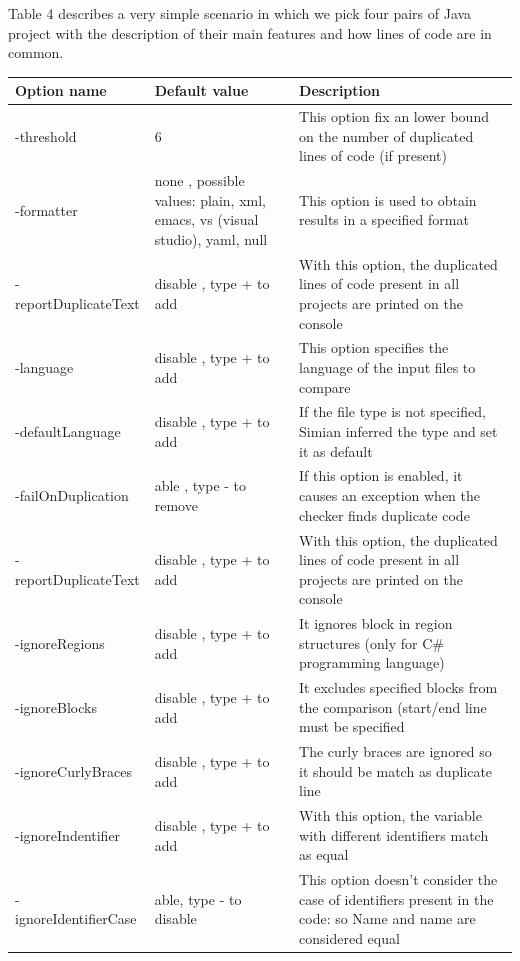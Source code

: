 Table 4 describes a very simple scenario in which we pick four pairs of Java project with the description of their main features and how lines of code are in common.

\begin{center}
	\begin{table}[!h]
		\small
		\begin{tabular}{|l|p{4cm}|p{6cm}|}\hline				
			\textbf{Option name} & \textbf{Default value} & 
			\textbf{Description} \\	\hline
			-threshold & 6 &This option fix an lower bound on the number   
			of duplicated lines of code (if present)  \\\hline
			-formatter &  none , possible values: plain, xml, emacs,    vs 
			(visual studio), yaml, null &   This option is used to obtain 
			results in a specified format\\\hline
			-reportDuplicateText & disable , type + to add &   With this 
			option, the duplicated lines of code  present in all projects 
			are printed on the console    \\\hline
			-language & disable , type + to add &  This option specifies the language of the input files to compare   \\\hline
			-defaultLanguage & disable , type + to add &   If the file type 
			is not specified, Simian inferred the type and set it as default    \\\hline
			-failOnDuplication & able , type - to remove & If this option is enabled, it causes an exception when the checker finds duplicate code     \\\hline
			-reportDuplicateText & disable , type + to add & With this 	option, the duplicated lines of code present in all projects are printed on the console    \\\hline
			-ignoreRegions & disable , type + to add & It ignores block in region structures (only for C\# programming language)  \\\hline
			-ignoreBlocks & disable , type + to add &  It excludes specified blocks from the comparison (start/end line must be specified  \\\hline
			-ignoreCurlyBraces & disable , type + to add & The curly braces are ignored  so it should be match as duplicate line \\\hline
			-ignoreIndentifier & disable , type + to add &   With this option, the variable with different identifiers match as equal 	\\\hline
			-ignoreIdentifierCase & able, type - to disable &  This option doesn't consider the case of identifiers present in the code: so Name and name are considered equal \\\hline

\end{tabular}
\end{table}
\end{center}
